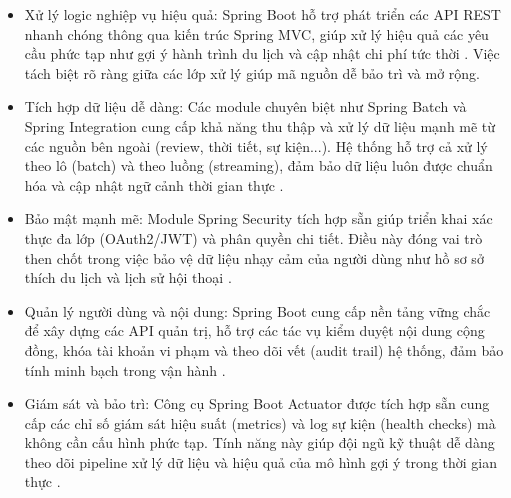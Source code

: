\begin{itemize}
    \item Xử lý logic nghiệp vụ hiệu quả: 
    Spring Boot hỗ trợ phát triển các API REST nhanh chóng thông qua kiến trúc Spring MVC, giúp xử lý hiệu quả các yêu cầu phức tạp như gợi ý hành trình du lịch và cập nhật chi phí tức thời \cite{walls-2022}. Việc tách biệt rõ ràng giữa các lớp xử lý giúp mã nguồn dễ bảo trì và mở rộng.
    
    \item Tích hợp dữ liệu dễ dàng: 
    Các module chuyên biệt như Spring Batch và Spring Integration cung cấp khả năng thu thập và xử lý dữ liệu mạnh mẽ từ các nguồn bên ngoài (review, thời tiết, sự kiện...). Hệ thống hỗ trợ cả xử lý theo lô (batch) và theo luồng (streaming), đảm bảo dữ liệu luôn được chuẩn hóa và cập nhật ngữ cảnh thời gian thực \cite{spring-batch-ref}.
    
    \item Bảo mật mạnh mẽ: 
    Module Spring Security tích hợp sẵn giúp triển khai xác thực đa lớp (OAuth2/JWT) và phân quyền chi tiết. Điều này đóng vai trò then chốt trong việc bảo vệ dữ liệu nhạy cảm của người dùng như hồ sơ sở thích du lịch và lịch sử hội thoại \cite{spring-security-ref}.
    
    \item Quản lý người dùng và nội dung: 
    Spring Boot cung cấp nền tảng vững chắc để xây dựng các API quản trị, hỗ trợ các tác vụ kiểm duyệt nội dung cộng đồng, khóa tài khoản vi phạm và theo dõi vết (audit trail) hệ thống, đảm bảo tính minh bạch trong vận hành \cite{musib-2020}.
    
    \item Giám sát và bảo trì: 
    Công cụ Spring Boot Actuator được tích hợp sẵn cung cấp các chỉ số giám sát hiệu suất (metrics) và log sự kiện (health checks) mà không cần cấu hình phức tạp. Tính năng này giúp đội ngũ kỹ thuật dễ dàng theo dõi pipeline xử lý dữ liệu và hiệu quả của mô hình gợi ý trong thời gian thực \cite{webb-2020, spring-boot-ref}.
\end{itemize}

